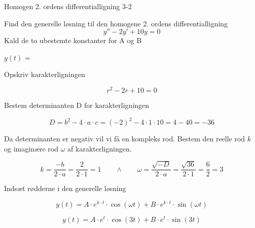 \documentclass{article}
\begin{document}
\begin{exercise}{Homogen 2. ordens differentialligning 3-2}
	
	Find den generelle løsning til den homogene 2. ordens differentialligning
	\[
	y'' - 2y' + 10y = 0
	\]
	Kald de to ubestemte konstanter for A og B
	
	$y(t)$ = 
	
	
	\hint 
	
	Opskriv karakterligningen
	
	\hint
	
	\[
	r^2 - 2r + 10 = 0
	\]
	
	
	\hint
	
	Bestem determinanten D for karakterligningen
	
	
	\hint 
	\[
	D = b^2 - 4 \cdot a \cdot c = (-2)^2 - 4 \cdot 1 \cdot 10  = 4- 40 = -36
	\]
	
	\hint 
	Da determinanten er negativ vil vi få en kompleks rod. Bestem den reelle rod $k$ og imaginære rod $\omega$ af karakterligningen.
	
	
	\hint
	
	\[
	k = \frac{-b}{2 \cdot a} = \frac{2}{2 \cdot 1} = 1 \qquad \wedge \qquad \omega = \frac{\sqrt{-D}}{2 \cdot a} = \frac{\sqrt{36}}{2 \cdot 1} = \frac{6}{2} = 3
	\]
	
	\hint
	
	Indsæt rødderne i den generelle løsning
	
	\hint
	\[
	y(t) = A \cdot e^{k \cdot t}  \cdot \cos(\omega t)+ B \cdot e^{k \cdot t}  \cdot \sin(\omega t)
	\]
	
	\hint
	
	\[
	y(t) = A \cdot e^{t}  \cdot \cos(3 t)+ B \cdot e^{ t}  \cdot \sin(3t)
	\]
	
\end{exercise}

\newpage
\end{document}
